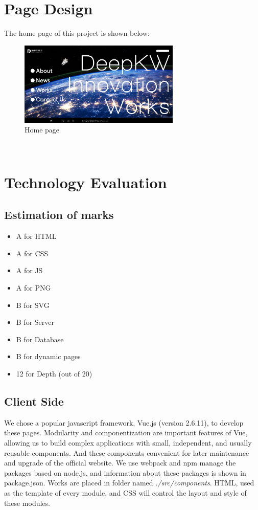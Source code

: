 \documentclass{article}
\begin{document}
\section{Page Design}
The home page of this project is shown below:
\\
\begin{figure}[h]
    \centering
    \includegraphics[height=4cm]{img/02.png}
    \caption{Home page}
    \label{fig: figure1}
\end{figure}
\\
\section{Technology Evaluation}
\subsection{Estimation of marks}
\begin{itemize}
    \item A for HTML
    \item A for CSS
    \item A for JS
    \item A for PNG
    \item B for SVG
    \item B for Server
    \item B for Database
    \item B for dynamic pages
    \item 12 for Depth (out of 20)
\end{itemize} 

\subsection{Client Side}
We chose a popular javascript framework, Vue.js (version 2.6.11), to 
develop these pages.
Modularity and componentization are important features of Vue,  
allowing us to build complex applications with small, independent, 
and usually reusable components. And these components convenient 
for later maintenance and upgrade of the official website. 
We use webpack and npm manage the packages based on node.js, and 
information about these packages is shown in package.json. Works are 
placed in folder named \textit{./src/components}. HTML, used as 
the template of every module, and CSS will control the layout 
and style of these modules.
\end{document}
